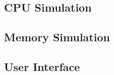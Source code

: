 \documentclass[letterpaper, 11pt, twoside]{article}
\begin{document}
\paragraph{}

\subsection{CPU Simulation}
\paragraph{}

\subsection{Memory Simulation}
\paragraph{}

\subsection{User Interface}
\paragraph{}

\end{document}

